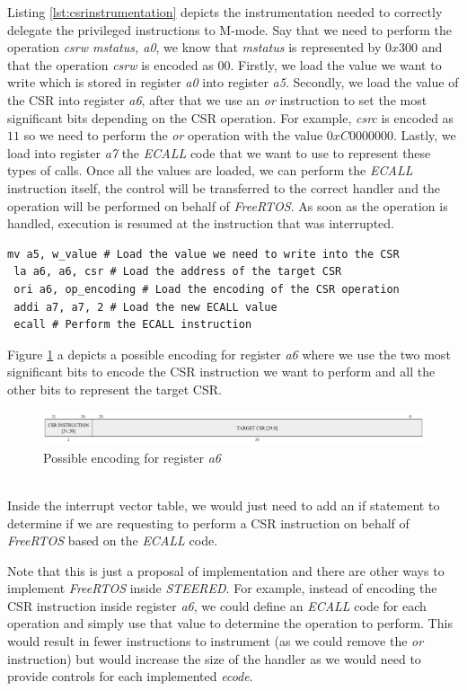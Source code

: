 Listing \ref{lst:csrinstrumentation} depicts the instrumentation needed to correctly
delegate the privileged instructions to M-mode. Say that we need to perform the
operation \textit{csrw mstatus, a0}, we know that \textit{mstatus} is represented
by $0x300$ and that the operation \textit{csrw} is encoded as $00$. Firstly, we
load the value we want to write which is stored in register \textit{a0} into register
\textit{a5}. Secondly, we load the value of the CSR into register \textit{a6},
after that we use an \textit{or} instruction to set the most significant bits depending
on the CSR operation. For example, \textit{csrc} is encoded as $11$ so we need
to perform the \textit{or} operation with the value $0xC0000000$. Lastly, we load
into register \textit{a7} the \textit{ECALL} code that we want to use to represent
these types of calls. Once all the values are loaded, we can perform the \textit{ECALL}
instruction itself, the control will be transferred to the correct handler and the
operation will be performed on behalf of \textit{FreeRTOS}. As soon as the operation
is handled, execution is resumed at the instruction that was interrupted. \\ \begin{lstlisting}[style=Assembly, caption = \textit{FreeRTOS} instrumentation for Control and Status Register operations, label={lst:csrinstrumentation}]
 mv a5, w_value # Load the value we need to write into the CSR
 la a6, a6, csr # Load the address of the target CSR
 ori a6, op_encoding # Load the encoding of the CSR operation
 addi a7, a7, 2 # Load the new ECALL value
 ecall # Perform the ECALL instruction
\end{lstlisting}

Figure \ref{fig:a6encoding} a depicts a possible encoding for register \textit{a6}
where we use the two most significant bits to encode the CSR instruction we want
to perform and all the other bits to represent the target CSR. \\
\begin{figure}[htbp]
  \centering
  \includegraphics[width=.9\linewidth]{images/freertos_encoding.png}
  \caption{Possible encoding for register \textit{a6}}
  \label{fig:a6encoding}
\end{figure}\\

Inside the interrupt vector table, we would just need to add an if statement to determine
if we are requesting to perform a CSR instruction on behalf of \textit{FreeRTOS}
based on the \textit{ECALL} code.

Note that this is just a proposal of implementation and there are other ways to implement
\textit{FreeRTOS} inside \textit{STEERED}. For example, instead of encoding the CSR
instruction inside register \textit{a6}, we could define an \textit{ECALL} code
for each operation and simply use that value to determine the operation to
perform. This would result in fewer instructions to instrument (as we could
remove the \textit{or} instruction) but would increase the size of the handler
as we would need to provide controls for each implemented \textit{ecode}.